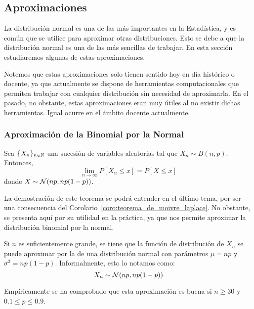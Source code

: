 \subsection{Aproximaciones}\label{sec:aproximaciones}

La distribución normal es una de las más importantes en la Estadística, y es común que se utilice para aproximar otras distribuciones.
Esto se debe a que la distribución normal es una de las más sencillas de trabajar. En esta sección estudiaremos algunas de estas aproximaciones.

\begin{observacion}
    Notemos que estas aproximaciones solo tienen sentido hoy en día histórico o docente, ya que
    actualmente se dispone de herramientas computacionales que permiten trabajar con cualquier distribución sin necesidad de aproximarla.
    En el pasado, no obstante, estas aproximaciones eran muy útiles al no existir dichas herramientas.
    Igual ocurre en el ámbito docente actualmente.
\end{observacion}

\subsubsection{Aproximación de la Binomial por la Normal}
\begin{prop}
    Sea $\{X_n\}_{n\in \mathbb{N}}$ una sucesión de variables aleatorias tal que $X_n\sim B(n,p)$. Entonces,
    \begin{equation*}
        \lim_{n\to \infty} P[X_n \leq x] = P\left[X\leq x\right]
    \end{equation*}
    donde $X\sim \mathcal{N}(np,np(1-p))$.
\end{prop}
La demostración de este teorema se podrá entender en el último tema, por ser una consecuencia del Corolario~\ref{coro:teorema_de_moivre_laplace}. No obstante, se presenta aquí por su utilidad en la práctica, ya que nos permite aproximar la distribución binomial por la normal.

Si $n$ es suficientemente grande, se tiene que la función de distribución de $X_n$ se puede aproximar por la de una distribución normal con parámetros $\mu = np$ y $\sigma^2 = np(1-p)$. Informalmente, esto lo notamos como:
\begin{equation*}
    X_n\sim \mathcal{N}(np,np(1-p))
\end{equation*}

Empíricamente se ha comprobado que esta aproximación es buena si $n\geq 30$ y $0.1\leq p\leq 0.9$.

